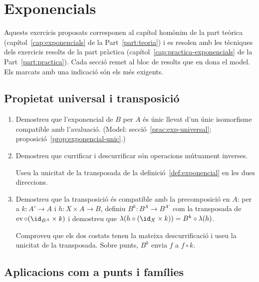 \chapter{Exponencials}\label{cap:exercicis-exponencials}

Aquests exercicis proposats corresponen al capítol homònim de la part teòrica (capítol~\ref{cap:exponencials} de la Part~\ref{part:teoria}) i es resolen amb les tècniques dels exercicis resolts de la part pràctica (capítol~\ref{cap:practica-exponencials} de la Part~\ref{part:practica}). Cada secció remet al bloc de resolts que en dona el model. Els marcats amb una indicació són els més exigents.

\section{Propietat universal i transposició}

\begin{enumerate}
  \item Demostreu que l'exponencial de \(B\) per \(A\) és únic llevat d'un únic isomorfisme compatible amb l'avaluació. (Model: secció~\ref{prac:exp-universal}; proposició~\ref{prop:exponencial-unic}.)

  \item Demostreu que currificar i descurrificar són operacions mútuament inverses. \begin{indicacio}Useu la unicitat de la transposada de la definició~\ref{def:exponencial} en les dues direccions.\end{indicacio}

  \item Demostreu que la transposició és compatible amb la precomposició en \(A\): per a \(k\colon A'\to A\) i \(h\colon X\times A\to B\), definiu \(B^{k}\colon B^{A}\to B^{A'}\) com la transposada de \(\operatorname{ev}\circ(\id_{B^A}\times k)\) i demostreu que \(\lambda(h\circ(\id_X\times k))=B^{k}\circ\lambda(h)\). \begin{indicacio}Comproveu que els dos costats tenen la mateixa descurrificació i useu la unicitat de la transposada. Sobre punts, \(B^k\) envia \(f\) a \(f\circ k\).\end{indicacio}
\end{enumerate}

\section{Aplicacions com a punts i famílies}

